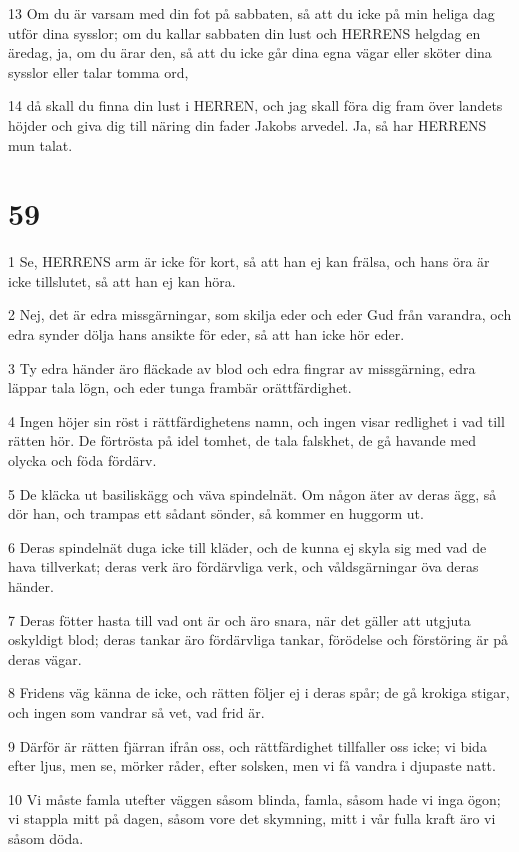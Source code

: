 \par 13 Om du är varsam med din fot på sabbaten, så att du icke på min heliga dag utför dina sysslor; om du kallar sabbaten din lust och HERRENS helgdag en äredag, ja, om du ärar den, så att du icke går dina egna vägar eller sköter dina sysslor eller talar tomma ord,
\par 14 då skall du finna din lust i HERREN, och jag skall föra dig fram över landets höjder och giva dig till näring din fader Jakobs arvedel. Ja, så har HERRENS mun talat.

\chapter{59}

\par 1 Se, HERRENS arm är icke för kort, så att han ej kan frälsa, och hans öra är icke tillslutet, så att han ej kan höra.
\par 2 Nej, det är edra missgärningar, som skilja eder och eder Gud från varandra, och edra synder dölja hans ansikte för eder, så att han icke hör eder.
\par 3 Ty edra händer äro fläckade av blod och edra fingrar av missgärning, edra läppar tala lögn, och eder tunga frambär orättfärdighet.
\par 4 Ingen höjer sin röst i rättfärdighetens namn, och ingen visar redlighet i vad till rätten hör. De förtrösta på idel tomhet, de tala falskhet, de gå havande med olycka och föda fördärv.
\par 5 De kläcka ut basiliskägg och väva spindelnät. Om någon äter av deras ägg, så dör han, och trampas ett sådant sönder, så kommer en huggorm ut.
\par 6 Deras spindelnät duga icke till kläder, och de kunna ej skyla sig med vad de hava tillverkat; deras verk äro fördärvliga verk, och våldsgärningar öva deras händer.
\par 7 Deras fötter hasta till vad ont är och äro snara, när det gäller att utgjuta oskyldigt blod; deras tankar äro fördärvliga tankar, förödelse och förstöring är på deras vägar.
\par 8 Fridens väg känna de icke, och rätten följer ej i deras spår; de gå krokiga stigar, och ingen som vandrar så vet, vad frid är.
\par 9 Därför är rätten fjärran ifrån oss, och rättfärdighet tillfaller oss icke; vi bida efter ljus, men se, mörker råder, efter solsken, men vi få vandra i djupaste natt.
\par 10 Vi måste famla utefter väggen såsom blinda, famla, såsom hade vi inga ögon; vi stappla mitt på dagen, såsom vore det skymning, mitt i vår fulla kraft äro vi såsom döda.
